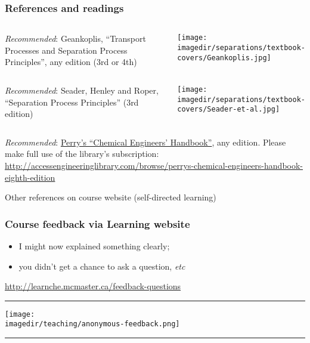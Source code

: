 \begin{frame}\frametitle{References and readings}
	\vspace{12pt}
	\begin{columns}[t]
			\emph{Recommended}: Geankoplis, ``Transport Processes and Separation Process Principles'', any edition (3rd or 4th)
			\vspace{-1cm}
			\begin{center}
				\texttt{[image: \\imagedir/separations/textbook-covers/Geankoplis.jpg]}
			\end{center}
	\end{columns}
	
	\vspace{12pt}
	\begin{columns}[t]
			\emph{Recommended}: Seader, Henley and Roper, ``Separation Process Principles'' (3rd edition)
			\vspace{-1cm}
			\begin{center}
				\texttt{[image: \\imagedir/separations/textbook-covers/Seader-et-al.jpg]}
			\end{center}
	\end{columns}
	\vspace{12pt}	
	\emph{Recommended}: \href{http://accessengineeringlibrary.com/browse/perrys-chemical-engineers-handbook-eighth-edition}{Perry's ``Chemical Engineers' Handbook''}, any edition. Please make full use of the library's subscription: \\
	\href{http://accessengineeringlibrary.com/browse/perrys-chemical-engineers-handbook-eighth-edition}{\tiny http://accessengineeringlibrary.com/browse/perrys-chemical-engineers-handbook-eighth-edition}
	
	\vspace{24pt}
	Other references on course website (self-directed learning)
	
\end{frame}

\begin{frame}\frametitle{Course feedback via Learning website}
	\begin{itemize}
		\item	I might now explained something clearly; 
		\item	you didn't get a chance to ask a question, \emph{etc}		
	\end{itemize}
	\href{http://learnche.mcmaster.ca/feedback-questions}{http://learnche.mcmaster.ca/feedback-questions}
	\vspace{12pt}
	\hrule
	\begin{center}
		\texttt{[image: \\imagedir/teaching/anonymous-feedback.png]}
	\end{center}
	\hrule
\end{frame}


